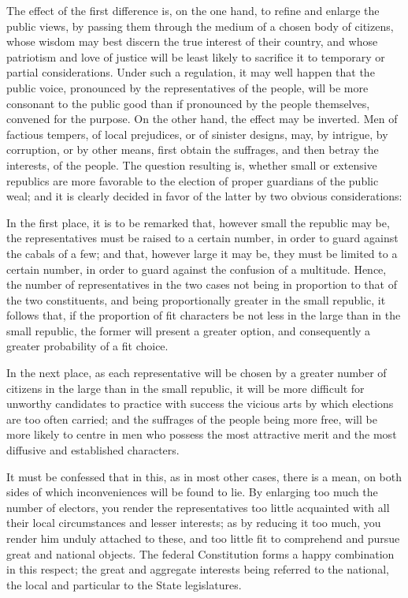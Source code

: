 The effect of the first difference is, on the one hand, to refine and enlarge the public views, by passing them through the medium of a chosen body of citizens, whose wisdom may best discern the true interest of their country, and whose patriotism and love of justice will be least likely to sacrifice it to temporary or partial considerations. 
Under such a regulation, it may well happen that the public voice, pronounced by the representatives of the people, will be more consonant to the public good than if pronounced by the people themselves, convened for the purpose. 
On the other hand, the effect may be inverted. 
Men of factious tempers, of local prejudices, or of sinister designs, may, by intrigue, by corruption, or by other means, first obtain the suffrages, and then betray the interests, of the people. 
The question resulting is, whether small or extensive republics are more favorable to the election of proper guardians of the public weal; and it is clearly decided in favor of the latter by two obvious considerations:

In the first place, it is to be remarked that, however small the republic may be, the representatives must be raised to a certain number, in order to guard against the cabals of a few; and that, however large it may be, they must be limited to a certain number, in order to guard against the confusion of a multitude. 
Hence, the number of representatives in the two cases not being in proportion to that of the two constituents, and being proportionally greater in the small republic, it follows that, if the proportion of fit characters be not less in the large than in the small republic, the former will present a greater option, and consequently a greater probability of a fit choice.

In the next place, as each representative will be chosen by a greater number of citizens in the large than in the small republic, it will be more difficult for unworthy candidates to practice with success the vicious arts by which elections are too often carried; and the suffrages of the people being more free, will be more likely to centre in men who possess the most attractive merit and the most diffusive and established characters.

It must be confessed that in this, as in most other cases, there is a mean, on both sides of which inconveniences will be found to lie. 
By enlarging too much the number of electors, you render the representatives too little acquainted with all their local circumstances and lesser interests; as by reducing it too much, you render him unduly attached to these, and too little fit to comprehend and pursue great and national objects. 
The federal Constitution forms a happy combination in this respect; the great and aggregate interests being referred to the national, the local and particular to the State legislatures.

